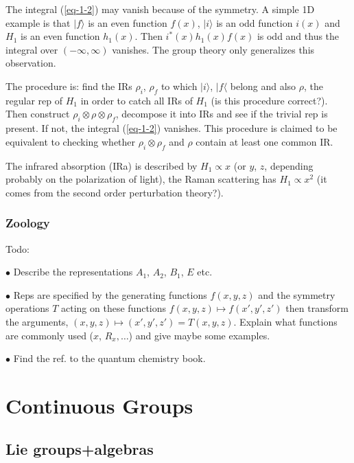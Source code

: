 The integral (\ref{eq-1-2}) may vanish because of the symmetry. A simple 1D
example is that $|f\rangle$ is an even function $f(x)$, $|i\rangle$ is an odd
function $i(x)$ and $H_1$ is an even function $h_1(x)$. Then
$i^*(x)h_1(x)f(x)$ is odd and thus the integral over $(-\infty,\infty)$
vanishes. The group theory only generalizes this observation.

The procedure is: find the IRs $\rho_i$, $\rho_f$ to which $|i\rangle$,
$|f\langle$ belong and also $\rho$, the regular rep of $H_1$ in order to catch
all IRs of $H_1$ (is this procedure correct?). Then construct
$\rho_i\otimes\rho\otimes\rho_f$, decompose it into IRs and see if the trivial
rep is present. If not, the integral (\ref{eq-1-2}) vanishes. This procedure
is claimed to be equivalent to checking whether $\rho_i\otimes \rho_f$ and
$\rho$ contain at least one common IR. 

The infrared absorption (IRa) is described by $H_1\propto x$ (or $y$, $z$,
depending probably on the polarization of light), the Raman scattering has
$H_1\propto x^2$ (it comes from the second order perturbation theory?).


\subsection{Zoology}

Todo:

\item{$\bullet$} Describe the representations $A_1$, $A_2$, $B_1$, $E$ etc. 

\item{$\bullet$} Reps are specified
by the generating functions $f(x,y,z)$ 
and the symmetry operations $T$ acting on these functions $f(x,y,z)\mapsto
f(x',y',z')$  then transform the arguments, $(x,y,z)\mapsto
(x',y',z')=T(x,y,z)$. Explain what functions are commonly used ($x$,
$R_x,\ldots$) and give maybe some examples.

\item{$\bullet$} Find the ref. to the quantum chemistry book.


\chapter{Continuous Groups}

\section{Lie groups+algebras}

